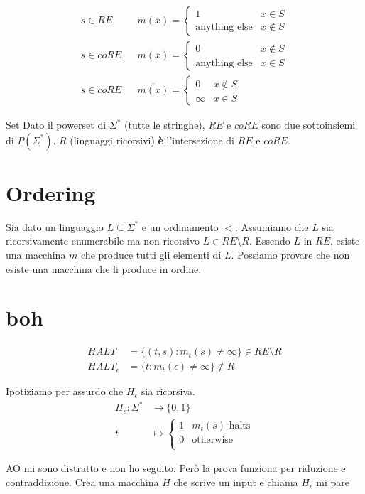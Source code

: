 \documentclass{article}
\begin{document}
\begin{align*}
    s\in RE && m(x) = \begin{cases}
        1 & x\in S \\
        \text{anything else} & x\not\in S
    \end{cases} 
    \\
        s\in coRE && m(x) = \begin{cases}
        0 & x\not\in S \\
        \text{anything else} & x\in S
    \end{cases}
    \\
        s\in coRE && \overline{m(x)} = \begin{cases}
        0 & x\not\in S \\
        \infty & x\in S
    \end{cases}
\end{align*}

\begin{callout}{Set}
    Dato il powerset di $\Sigma^*$ (tutte le stringhe), $RE$ e $coRE$ sono due sottoinsiemi di $P(\Sigma^*)$. $R$ (linguaggi ricorsivi) \textbf{è} l'intersezione di $RE$ e $coRE$.
\end{callout}

\section{Ordering}
Sia dato un linguaggio $L\subseteq \Sigma^*$ e un ordinamento $<$. Assumiamo che $L$ sia ricorsivamente enumerabile ma non ricorsivo $L\in RE\setminus R$.
Essendo $L$ in $RE$, esiste una macchina $m$ che produce tutti gli elementi di $L$. Possiamo provare che non esiste una macchina che li produce in ordine.

\section{boh}
\begin{align*}
    HALT &= \{(t,s): m_t(s)\neq\infty\} \in RE\setminus R \\
    HALT_\epsilon &= \{t: m_t(\epsilon)\neq\infty\} \not\in R
\end{align*}

Ipotiziamo per assurdo che $H_\epsilon$ sia ricorsiva.
\begin{align*}
    H_\epsilon: \Sigma^*&\to\{0,1\} \\
    t &\mapsto \begin{cases}
        1 & m_t(s)\text{ halts} \\
        0 & \text{otherwise} \\
    \end{cases}
\end{align*}
\begin{warning}{AO}
    mi sono distratto e non ho seguito. Però la prova funziona per riduzione e contraddizione. Crea una macchina $H$ che scrive un input e chiama $H_\epsilon$ mi pare
\end{warning}
\end{document}

